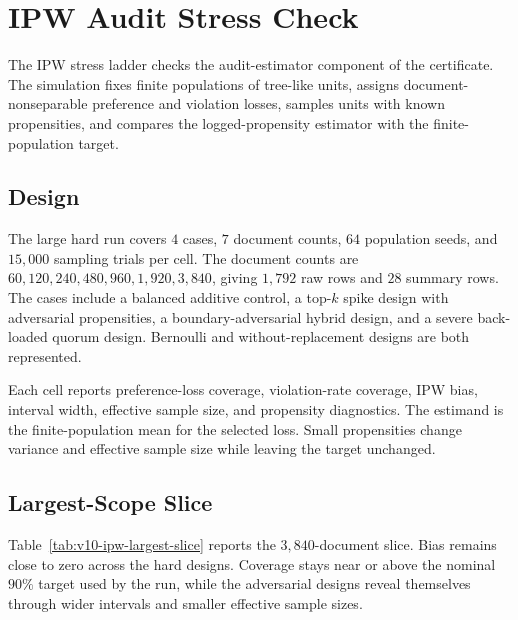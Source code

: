 \section{IPW Audit Stress Check}
\label{app:v10-ipw-stress}

The IPW stress ladder checks the audit-estimator component of the
certificate. The simulation fixes finite populations of tree-like
units, assigns document-nonseparable preference and violation losses,
samples units with known propensities, and compares the
logged-propensity estimator with the finite-population target.

\subsection{Design}

The large hard run covers \(4\) cases, \(7\) document counts, \(64\)
population seeds, and \(15{,}000\) sampling trials per cell. The
document counts are \(60,120,240,480,960,1{,}920,3{,}840\), giving
\(1{,}792\) raw rows and \(28\) summary rows. The cases include a
balanced additive control, a top-\(k\) spike design with adversarial
propensities, a boundary-adversarial hybrid design, and a severe
back-loaded quorum design. Bernoulli and without-replacement designs
are both represented.

Each cell reports preference-loss coverage, violation-rate coverage,
IPW bias, interval width, effective sample size, and propensity
diagnostics. The estimand is the finite-population mean for the
selected loss. Small propensities change variance and effective
sample size while leaving the target unchanged.

\subsection{Largest-Scope Slice}

Table~\ref{tab:v10-ipw-largest-slice} reports the \(3{,}840\)-document
slice. Bias remains close to zero across the hard designs. Coverage
stays near or above the nominal \(90\%\) target used by the run, while
the adversarial designs reveal themselves through wider intervals and
smaller effective sample sizes.

